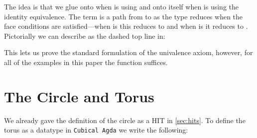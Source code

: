 The idea is that we glue  onto  when  is 
using  and  onto itself when  is  using
the identity equivalence. The term   is a path from
 to  as the  type reduces when the face
conditions are satisfied---when  is  this reduces to
 and when  is  it reduces to . %
Pictorially we can describe   as the dashed top line
in:
%
\begin{mathpar}
\end{mathpar}

This lets us prove the standard formulation of the univalence axiom,
however, for all of the examples in this paper the  function
suffices.


\section{The Circle and Torus}
\label{sec:torus}

We already gave the definition of the circle as a HIT in
\cref{sec:hits}. To define the torus as a datatype in \texttt{Cubical Agda} we write the following:
%

